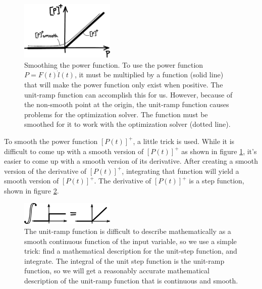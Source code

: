 \begin{figure}[h]		%
\begin{centering}
\includegraphics[width=0.4\textwidth]{Figures/SmoothedFunction}\par
\end{centering}
\caption[Plot: Smooth Power Function]{Smoothing the power function. To use the power function $P=F(t)\dot{l}(t)$, it must be multiplied by a function (solid line) that will make the power function only exist when positive. The unit-ramp function can accomplish this for us. However, because of the non-smooth point at the origin, the unit-ramp function causes problems for the optimization solver. The function must be smoothed for it to work with the optimization solver (dotted line).}
\label{fig:SmoothedFunction}
\end{figure}
%

To smooth the power function $[P(t)]^{+}$, a little trick is used. While it is difficult to come up with a smooth version of $[P(t)]^{+}$ as shown in figure \ref{fig:SmoothedFunction}, it's easier to come up with a smooth version of its derivative. After creating a smooth version of the derivative of $[P(t)]^{+}$, integrating that function will yield a smooth version of $[P(t)]^{+}$. The derivative of $[P(t)]^{+}$ is a step function, shown in figure \ref{fig:IntegralFunction}.

\begin{figure}[h]		%
\begin{centering}
\includegraphics[width=0.4\textwidth]{Figures/IntegralFunction}\par
\end{centering}
\caption[Diagram: Creating an Integral Function]{The unit-ramp function is difficult to describe mathematically as a smooth continuous function of the input variable, so we use a simple trick: find a mathematical description for the unit-step function, and integrate. The integral of the unit step function is the unit-ramp function, so we will get a reasonably accurate mathematical description of the unit-ramp function that is continuous and smooth.}
\label{fig:IntegralFunction}
\end{figure}
%

